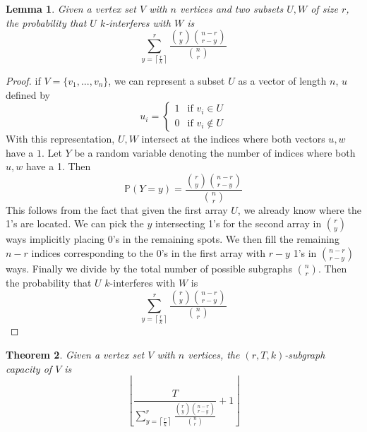 \documentclass[10pt]{extarticle}
\newtheorem{theorem}{Theorem}
\newtheorem{lemma}[theorem]{Lemma}
\theoremstyle{definition}
\begin{document}
\begin{lemma}
    Given a vertex set $V$ with $n$ vertices and two subsets $U,W$ of size $r$, the probability that $U$ $k$-interferes with $W$ is 
    \begin{equation*}
        \sum_{y = \left\lceil \frac{r}{k} \right\rceil}^{r}  \frac{\binom{r}{y} \binom{n-r}{r-y}}{\binom{n}{r}}
    \end{equation*}
\end{lemma}
\begin{proof}
    if $V = \{v_1,...,v_n\}$, we can represent a subset $U$ as a vector of length $n$, $u$ defined by
    $$
    u_i = \begin{cases}
        1 & \text{if } v_i \in U \\
        0 & \text{if } v_i \notin U
    \end{cases}
    $$
    With this representation, $U,W$ intersect at the indices where both vectors $u, w$ have a $1$. Let $Y$ be a random variable denoting the number of indices where both $u, w$ have a 1. Then 
    \begin{equation}
        \mathbb{P}(Y=y) = \frac{\binom{r}{y} \binom{n-r}{r-y}}{\binom{n}{r}}
    \end{equation}
    This follows from the fact that given the first array $U$, we already know where the 1's are located. We can pick the $y$ intersecting 1's for the second array in $\binom{r}{y}$ ways implicitly placing 0's in the remaining spots. We then fill the remaining $n-r$ indices corresponding to the 0's in the first array with $r-y$ 1's in $\binom{n-r}{r-y}$ ways. Finally we divide by the total number of possible subgraphs $\binom{n}{r}$. 
    Then the probability that $U$ $k$-interferes with $W$ is 
    \begin{equation}
        \sum_{y = \left\lceil \frac{r}{k} \right\rceil}^{r}  \frac{\binom{r}{y} \binom{n-r}{r-y}}{\binom{n}{r}}
    \end{equation}
\end{proof}


\begin{theorem}
    Given a vertex set $V$ with $n$ vertices, the $(r,T,k)$-subgraph capacity of $V$ is 
    \begin{equation*}
        \left\lfloor \frac{T}{\sum_{y = \left\lceil \frac{r}{k} \right\rceil}^{r}  \frac{\binom{r}{y} \binom{n-r}{r-y}}{\binom{n}{r}}} + 1 \right\rfloor
    \end{equation*}
\end{theorem}
\end{document}
